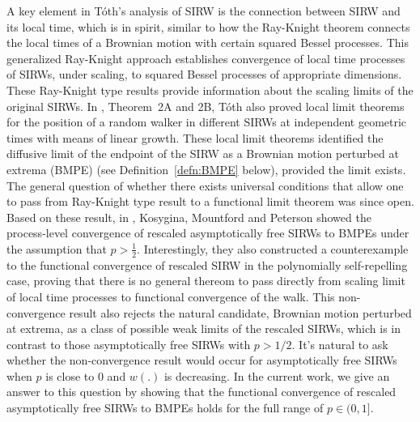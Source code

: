 \documentclass[EJP]{ejpecp} %
\begin{document}
A key element in T\'oth's analysis of SIRW is the connection between SIRW and its local time, which is in spirit, similar to how the Ray-Knight theorem connects the local times of a Brownian motion with certain squared Bessel processes. 
This generalized Ray-Knight approach establishes convergence of local time processes of SIRWs, under scaling, to squared Bessel processes of appropriate dimensions. These Ray-Knight type results provide information about the scaling limits of the original SIRWs.
In \cite{T96}, Theorem~2A and 2B, T\'oth also proved local limit theorems for the position of a random walker in different SIRWs at independent geometric times with means of linear growth. 
These local limit theorems identified the diffusive limit of the endpoint of the SIRW as a Brownian motion perturbed at extrema (BMPE) (see Definition~\ref{defn:BMPE} below), provided the limit exists. 
The general question of whether there exists universal conditions that allow one to pass from Ray-Knight type result to a functional limit theorem was since open.
Based on these result, in \cite{KMP23}, Kosygina, Mountford and Peterson showed the process-level convergence of rescaled asymptotically free SIRWs to BMPEs under the assumption that $p > \frac{1}{2}$. Interestingly, they also constructed a counterexample to the functional convergence of rescaled SIRW in the polynomially self-repelling case, proving that there is no general thereom to pass directly from scaling limit of local time processes to functional convergence of the walk.
This non-convergence result also rejects the natural candidate, Brownian motion perturbed at extrema, as a class of possible weak limits of the rescaled SIRWs, which is in contrast to those asymptotically free SIRWs with $p>1/2$. It's natural to ask whether the non-convergence result would occur for asymptotically free SIRWs when $p$ is close to $0$ and $w(.)$ is decreasing.
In the current work, we give an answer to this question by showing that the functional convergence of rescaled asymptotically free SIRWs to BMPEs holds for the full range of $p \in (0,1]$.
\end{document}
